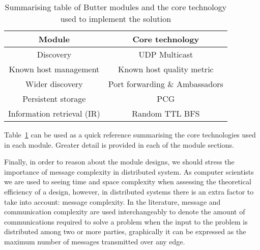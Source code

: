 \begin{table}[ht]
    \center
    \begin{tabular}{|c|c|}
        \hline
        \textbf{Module}            & \textbf{Core technology}       \\
        \hline
        Discovery                  & UDP Multicast                  \\
        Known host management      & Known host quality metric      \\
        Wider discovery            & Port forwarding \& Ambassadors \\
        Persistent storage         & PCG                            \\
        Information retrieval (IR) & Random TTL BFS                 \\
        \hline
    \end{tabular}
    \caption{Summarising table of Butter modules and the core technology used to implement the solution}
    \label{tab:butterModules}
\end{table}

Table~\ref{tab:butterModules} can be used as a quick reference summarising the core technologies used in each module. Greater detail is provided in each of the module sections.

Finally, in order to reason about the module designs, we should stress the importance of message complexity in distributed system. As computer scientists we are used to seeing time and space complexity when assessing the theoretical efficiency of a design, however, in distributed systems there is an extra factor to take into account: message complexity. In the literature, message and communication complexity are used interchangeably to denote the amount of communications required to solve a problem when the input to the problem is distributed among two or more parties, graphically it can be expressed as the maximum number of messages transmitted over any edge\cite{yao2009communication}.
